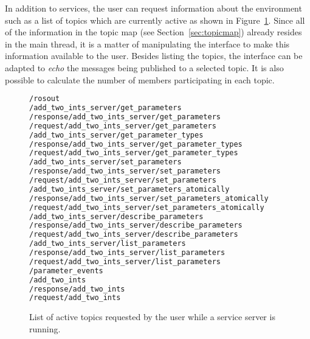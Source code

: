         In addition to services, the user can request information about the environment such as a list of topics which are currently active as shown in Figure~\ref{fig:topics}. Since all of the information in the topic map (see Section~\ref{sec:topicmap}) already resides in the main thread, it is a matter of manipulating the interface to make this information available to the user. Besides listing the topics, the interface can be adapted to \textit{echo} the messages being published to a selected topic. It is also possible to calculate the number of members participating in each topic.


        \begin{figure}[htbp]
            \centering

            \vspace{1em}
            \begin{lstlisting}[language=Bash]
/rosout
/add_two_ints_server/get_parameters
/response/add_two_ints_server/get_parameters
/request/add_two_ints_server/get_parameters
/add_two_ints_server/get_parameter_types
/response/add_two_ints_server/get_parameter_types
/request/add_two_ints_server/get_parameter_types
/add_two_ints_server/set_parameters
/response/add_two_ints_server/set_parameters
/request/add_two_ints_server/set_parameters
/add_two_ints_server/set_parameters_atomically
/response/add_two_ints_server/set_parameters_atomically
/request/add_two_ints_server/set_parameters_atomically
/add_two_ints_server/describe_parameters
/response/add_two_ints_server/describe_parameters
/request/add_two_ints_server/describe_parameters
/add_two_ints_server/list_parameters
/response/add_two_ints_server/list_parameters
/request/add_two_ints_server/list_parameters
/parameter_events
/add_two_ints
/response/add_two_ints
/request/add_two_ints
\end{lstlisting}
            \caption{List of active topics requested by the user while a service server is running.}
            \label{fig:topics}
        \end{figure}

